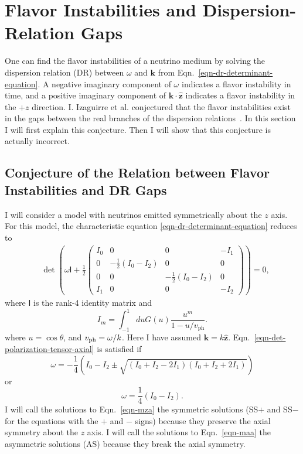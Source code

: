 \section{\label{chap:collective-sec:fast-mode-subsec:instabilities-and-gaps}Flavor Instabilities and Dispersion-Relation Gaps}

One can find the flavor instabilities of a neutrino medium by solving the dispersion relation (DR) between $\omega$ and $\mathbf k$ from Eqn.~\ref{eqn-dr-determinant-equation}. A negative imaginary component of $\omega$ indicates a flavor instability in time, and a positive imaginary component of $\mathbf k \cdot \hat{\mathbf z}$ indicates a flavor instability in the $+z$ direction. I. Izaguirre et al. conjectured that the flavor instabilities exist in the gaps between the real branches of the dispersion relations~\cite{Izaguirre2016a}. In this section I will first explain this conjecture. Then I will show that this conjecture is actually incorrect.


\subsection{Conjecture of the Relation between Flavor Instabilities and DR Gaps}

I will consider a model with neutrinos emitted symmetrically about the $z$ axis. For this model, the characteristic equation \eqref{eqn-dr-determinant-equation} reduces to
\begin{align}
&\det \left( \omega \mathsf{I} + \frac{1}{2}
\begin{pmatrix}
   I_0 & 0 & 0 & -I_1 \\
   0 & -\frac{1}{2} (I_0 - I_2) & 0 & 0 \\
   0 & 0 & -\frac{1}{2} (I_0 - I_2) & 0 \\
   I_1 & 0 & 0 & -I_2
\end{pmatrix}\right) =0,
\label{eqn-det-polarization-tensor-axial}
\end{align}
where $\mathsf I$ is the rank-4 identity matrix and
\begin{equation}
   I_m =\int_{-1}^{1} d u G(u) \frac{u^m}{1 -  u/v_{\mathrm{ph}} }.
\end{equation}
where $u=\cos\theta$, and $v_{\mathrm{ph}}=\omega/k$. Here I have assumed $\mathbf k = k \hat{\mathbf z}$. %
Eqn.~\ref{eqn-det-polarization-tensor-axial} is satisfied if
\begin{equation}
    \omega  = - \frac{1}{4} \left( I_0 - I_2 \pm \sqrt{ (I_0 + I_2 - 2 I_1) (I_0 + I_2 + 2 I_1) } \right)
    \label{eqn-mza}
\end{equation}
or
\begin{equation}
   \omega = \frac{1}{4}(I_0 - I_2).
   \label{eqn-maa}
\end{equation}
I will call the solutions to Eqn.~\ref{eqn-mza} the symmetric solutions (SS$+$ and SS$-$ for the equations with the $+$ and $-$ signs) because they preserve the axial symmetry about the $z$ axis. I will call the solutions to Eqn.~\ref{eqn-maa} the asymmetric solutions (AS) because they break the axial symmetry.

